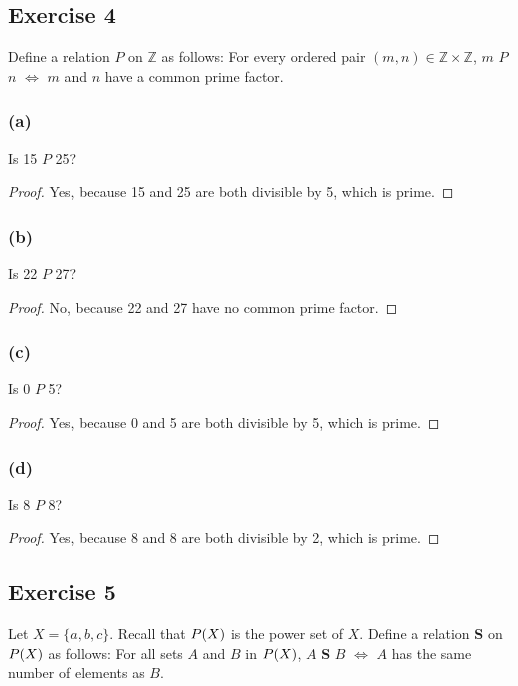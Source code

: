 \documentclass[14pt]{extarticle}
\let\mathscr\relax
\newcommand{\ps}{\mathscr{P}} %
\newcommand{\Z}{\mathbb{Z}}
\begin{document}
\subsection{Exercise 4}
Define a relation $P$ on $\Z$ as follows: For every ordered pair \((m, n) \in \Z \times \Z\), $m$ $P$ $n$ \(\iff\) $m$
and $n$ have a common prime factor.

\subsubsection{(a)}
Is 15 $P$ 25?

\begin{proof}
        Yes, because 15 and 25 are both divisible by 5, which is prime.
\end{proof}

\subsubsection{(b)}
Is 22 $P$ 27?

\begin{proof}
        No, because 22 and 27 have no common prime factor.
\end{proof}

\subsubsection{(c)}
Is 0 $P$ 5?

\begin{proof}
        Yes, because 0 and 5 are both divisible by 5, which is prime.
\end{proof}

\subsubsection{(d)}
Is 8 $P$ 8?

\begin{proof}
        Yes, because 8 and 8 are both divisible by 2, which is prime.
\end{proof}

\subsection{Exercise 5}
Let \(X = \{a, b, c\}\). Recall that \(\ps(X)\) is the power set of $X$. Define a relation {\bf S} on \(\ps(X)\)
as follows: For all sets $A$ and $B$ in \(\ps(X)\), $A$ {\bf S} $B$ $\iff$ $A$ has the same number of elements as $B$.
\end{document}
